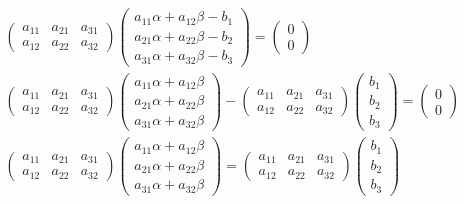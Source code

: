 \documentclass[11pt]{article} %
\begin{document}
\begin{enumerate}[a)]
\begin{eqnarray*}
&& \begin{pmatrix}a_{11} & a_{21} & a_{31} \\ a_{12} & a_{22} & a_{32}\end{pmatrix}
\begin{pmatrix} a_{11}\alpha + a_{12}\beta - b_1 \\ a_{21}\alpha + a_{22}\beta - b_2 \\ a_{31}\alpha + a_{32}\beta - b_3 \end{pmatrix} = \begin{pmatrix}0\\0\end{pmatrix} \\
&& \begin{pmatrix}a_{11} & a_{21} & a_{31} \\ a_{12} & a_{22} & a_{32}\end{pmatrix}
\begin{pmatrix} a_{11}\alpha + a_{12}\beta \\ a_{21}\alpha + a_{22}\beta \\ a_{31}\alpha + a_{32}\beta \end{pmatrix}
- \begin{pmatrix}a_{11} & a_{21} & a_{31} \\ a_{12} & a_{22} & a_{32}\end{pmatrix}
\begin{pmatrix} b_1 \\  b_2 \\ b_3 \end{pmatrix}
= \begin{pmatrix}0\\0\end{pmatrix} \\
&& \begin{pmatrix}a_{11} & a_{21} & a_{31} \\ a_{12} & a_{22} & a_{32}\end{pmatrix}
\begin{pmatrix} a_{11}\alpha + a_{12}\beta \\ a_{21}\alpha + a_{22}\beta \\ a_{31}\alpha + a_{32}\beta \end{pmatrix}
= \begin{pmatrix}a_{11} & a_{21} & a_{31} \\ a_{12} & a_{22} & a_{32}\end{pmatrix}
\begin{pmatrix} b_1 \\  b_2 \\ b_3 \end{pmatrix} \\

\end{eqnarray*}
\end{enumerate}
\end{document}
